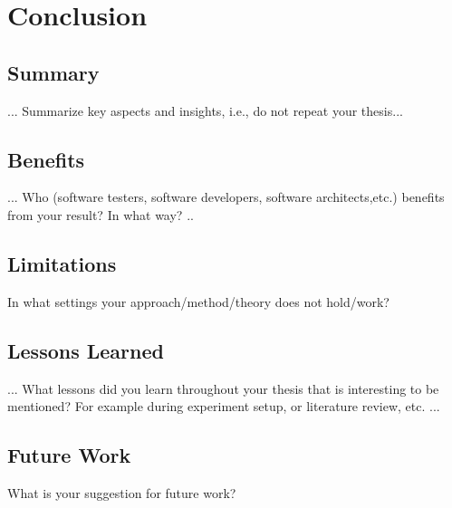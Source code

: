 
\chapter{Conclusion}
\label{chap:conclusion}


\section{Summary}
... Summarize key aspects and insights, i.e., do not repeat your thesis...
\section{Benefits}
... Who (software testers, software developers, software architects,etc.) benefits from your result? In what way?   ..
\section{Limitations}
In what settings your approach/method/theory does not hold/work?
\section{Lessons Learned}
... What lessons did you learn throughout your thesis that is interesting to be mentioned? For example during experiment setup, or literature review, etc. ... 
\section{Future Work}
What is your suggestion for future work?
